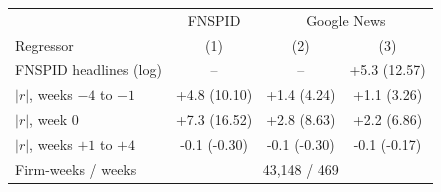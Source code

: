 \begin{tabular}{lccc}
\toprule
 & \multicolumn{1}{c}{FNSPID} & \multicolumn{2}{c}{Google News} \\
Regressor & (1) & (2) & (3) \\
\midrule
FNSPID headlines (log) & -- & -- & +5.3 (12.57) \\
$|r|$, weeks $-4$ to $-1$ & +4.8 (10.10) & +1.4 (4.24) & +1.1 (3.26) \\
$|r|$, week 0 & +7.3 (16.52) & +2.8 (8.63) & +2.2 (6.86) \\
$|r|$, weeks $+1$ to $+4$ & -0.1 (-0.30) & -0.1 (-0.30) & -0.1 (-0.17) \\
\midrule
Firm-weeks / weeks & \multicolumn{3}{c}{43,148 / 469} \\
\bottomrule
\end{tabular}
